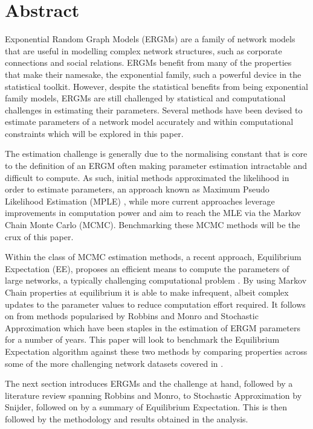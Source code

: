 \section{Abstract}

Exponential Random Graph Models (ERGMs) are a family of network models that are useful in modelling complex network structures, such as corporate connections and social relations. ERGMs benefit from many of the properties that make their namesake, the exponential family, such a powerful device in the statistical toolkit. However, despite the statistical benefits from being exponential family models, ERGMs are still challenged by statistical and computational challenges in estimating their parameters. Several methods have been devised to estimate parameters of a network model accurately and within computational constraints which will be explored in this paper.

The estimation challenge is generally due to the normalising constant that is core to the definition of an ERGM often making parameter estimation intractable and difficult to compute. As such, initial methods approximated the likelihood in order to estimate parameters, an approach known as Maximum Pseudo Likelihood Estimation (MPLE) \cite{straussikeda1990}, while more current approaches leverage improvements in computation power and aim to reach the MLE via the Markov Chain Monte Carlo (MCMC). Benchmarking these MCMC methods will be the crux of this paper.

Within the class of MCMC estimation methods, a recent approach, Equilibrium Expectation (EE), proposes an efficient means to compute the parameters of large networks, a typically challenging computational problem \cite{eqexpectation}. By using Markov Chain properties at equilibrium it is able to make infrequent, albeit complex updates to the parameter values to reduce computation effort required. It follows on from methods popularised by Robbins and Monro \cite{robbinsmonro1951} and Stochastic Approximation \cite{snijders2002} which have been staples in the estimation of ERGM parameters for a number of years. This paper will look to benchmark the Equilibrium Expectation algorithm against these two methods by comparing properties across some of the more challenging network datasets covered in \cite{hummels2012}.

The next section introduces ERGMs and the challenge at hand, followed by a literature review spanning Robbins and Monro, to Stochastic Approximation by Snijder, followed on by a summary of Equilibrium Expectation. This is then followed by the methodology and results obtained in the analysis. 
